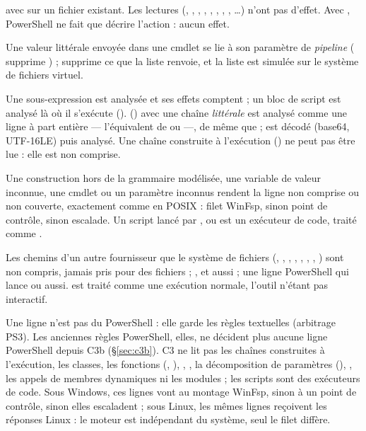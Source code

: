 \begin{description}[style=nextline,leftmargin=0.6cm,font=\sffamily\bfseries]
    avec  sur un fichier existant. Les lectures (,
    , , , , ,
    , , \ldots) n'ont pas d'effet. Avec , PowerShell ne fait que
    décrire l'action : aucun effet.
  \item[\textit{Pipelines}]
    Une valeur littérale envoyée dans une cmdlet se lie à son paramètre de \textit{pipeline}
    ( supprime ) ;  supprime ce que la liste renvoie, et la liste est simulée sur le système de
    fichiers virtuel.
  \item[Du code caché dans du code]
    Une sous-expression est analysée et ses effets comptent ; un bloc de script est analysé là
    où il s'exécute ().  () avec
    une chaîne \emph{littérale} est analysé comme une ligne à part entière --- l'équivalent de
     ou  ---, de même que  ;
     est décodé (base64, UTF-16LE) puis analysé. Une chaîne
    construite à l'exécution () ne peut pas être lue : elle est non comprise.
  \item[Rien n'est deviné]
    Une construction hors de la grammaire modélisée, une variable de valeur inconnue, une
    cmdlet ou un paramètre inconnus rendent la ligne non comprise ou non couverte, exactement
    comme en POSIX : filet WinFsp, sinon point de contrôle, sinon escalade. Un script lancé par
    ,  ou  est un
    exécuteur de code, traité comme .
  \item[Des choix plus stricts]
    Les chemins d'un autre fournisseur que le système de fichiers (, ,
    , , , , , ) sont
    non compris, jamais pris pour des fichiers ; ,  et
     aussi ; une ligne PowerShell qui lance  ou  aussi.
     est traité comme une exécution normale, l'outil n'étant pas interactif.
\end{description}

Une ligne  n'est pas du PowerShell : elle garde les règles textuelles
(arbitrage PS3). Les anciennes règles PowerShell, elles, ne décident plus aucune ligne
PowerShell depuis C3b (§\ref{sec:c3b}). C3 ne lit
pas les chaînes construites à l'exécution, les classes, les fonctions (,
), , , la décomposition de paramètres (),
\cmd{--\%}, les appels de membres dynamiques ni les modules ; les scripts  sont des
exécuteurs de code. Sous Windows, ces lignes vont au montage WinFsp, sinon à un point de
contrôle, sinon elles escaladent ; sous Linux, les mêmes lignes reçoivent les réponses Linux :
le moteur est indépendant du système, seul le filet diffère.

